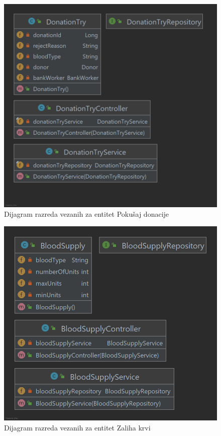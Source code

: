         		\begin{figure}[H]
                    \includegraphics[scale=0.25]{slike/donationtry.png}
        			\centering
        			\caption{Dijagram razreda vezanih za entitet Pokušaj donacije}
        			\label{fig:hztm-stranica}
        		\end{figure}
        		
        		\begin{figure}[H]
                    \includegraphics[scale=0.25]{slike/bloodsupply.png}
        			\centering
        			\caption{Dijagram razreda vezanih za entitet Zaliha krvi}
        			\label{fig:hztm-stranica}
        		\end{figure}
        		
